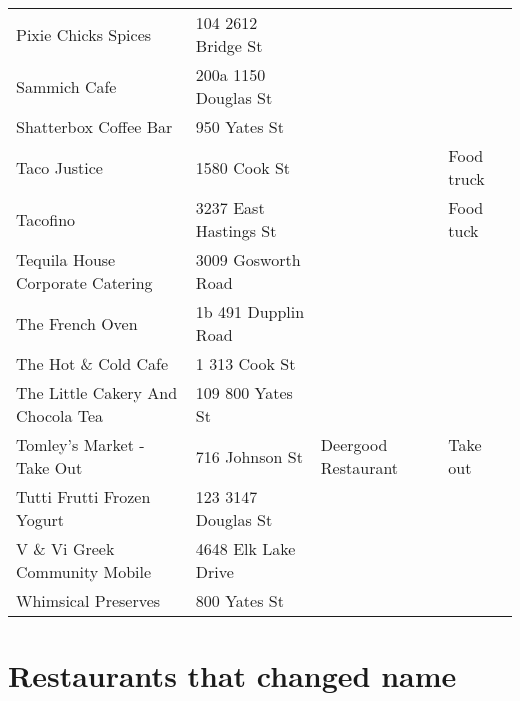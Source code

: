 \documentclass[9pt]{article}
\begin{document}
\begin{tabular}{p{5cm}|p{4cm}|p{5cm}|p{3cm}}
Pixie Chicks Spices                        & 104 2612 Bridge St          &                                   &                 \\
Sammich Cafe                               & 200a 1150 Douglas St        &                                   &                 \\
Shatterbox Coffee Bar                      & 950 Yates St                &                                   &                 \\
Taco Justice                               & 1580 Cook St                &                                   &  Food truck               \\
Tacofino                                   & 3237 East Hastings St       &                                   &  Food tuck \\
Tequila House Corporate Catering           & 3009 Gosworth Road          &                                   &                 \\
The French Oven                            & 1b 491 Dupplin Road         &                                   &                 \\
The Hot \& Cold Cafe                       & 1 313 Cook St               &                                   &                 \\
The Little Cakery And Chocola Tea          & 109 800 Yates St            &                                   &                 \\
Tomley's Market - Take Out                 & 716 Johnson St              & Deergood Restaurant               & Take out                \\
Tutti Frutti Frozen Yogurt                 & 123 3147 Douglas St         &                                   &                 \\
V \& Vi Greek Community Mobile             & 4648 Elk Lake Drive         &                                   &                 \\
Whimsical Preserves                        & 800 Yates St                &                                   &                 \\
\end{tabular}

\pagebreak

\section{Restaurants that changed name}
\label{sec-2}
\end{document}
